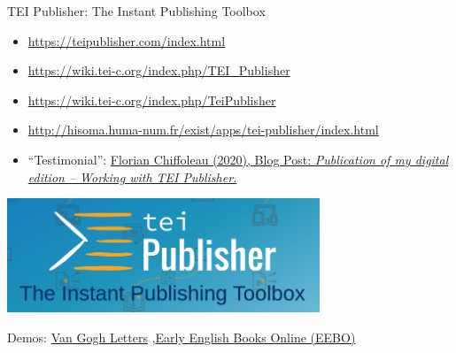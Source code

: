 
\begin{frame}[allowframebreaks]{TEI Publisher: The Instant Publishing Toolbox}
    \begin{itemize}
        \item \protect\url{https://teipublisher.com/index.html}
        \item \protect\url{https://wiki.tei-c.org/index.php/TEI_Publisher}
        \item \protect\url{https://wiki.tei-c.org/index.php/TeiPublisher}
        \item \protect\url{http://hisoma.huma-num.fr/exist/apps/tei-publisher/index.html}
        \item ``Testimonial'': \href{https://digitalintellectuals.hypotheses.org/3912}{Florian Chiffoleau (2020), Blog Post: \emph{Publication of my digital edition -- Working with TEI Publisher.}}
    \end{itemize}
    
    \includegraphics[width=0.7\textwidth]{img/tei-publisher1.png}
    
    \framebreak
    
    Demos:  \href{https://teipublisher.com/exist/apps/vangogh/let001.xml}{Van Gogh Letters} \sep \href{https://teipublisher.com/exist/apps/eebo/index.html}{Early English Books Online (EEBO)}
    

\end{frame}
